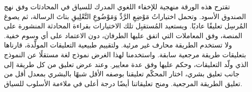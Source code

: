 %
تقترح هذه الورقة منهجية للإخفاء اللغوي المدرك للسياق في المحادثات وفق نهج الصندوق الأسود. وتحمل اختياراتُ مَوْضِعِ الرَّدِّ وَمَوْضُوعِ التَّعْلِيقِ بتاتَ الرسالة، ثم يصوغ المُرسِل تعليقًا عاديًا.
ويستعيد المُستقبِل تلك الاختيارات بقراءة المحادثة المنشورة على المنصة، وفق المعاملات التي اتفق عليها الطرفان، دون الاعتماد على أي وسوم خفية.
ولا تستخدم الطريقة محارف غير مرئية.
ولتقييم طبيعية التعليقات المولَّدة، قارناها بتعليقات طريقة مرجعية سابقة. واستخدمنا لهذا الغرض نموذج لغة مستقلًا عن النموذج الذي ولّد التعليقات، وحكم عليها وفق عدة معايير.
وعند عرض تعليق من كل طريقة إلى جانب تعليق بشري، اختار المحكّم تعليقنا بوصفه الأقل شبهًا بالبشري بمعدل أقل من تعليق الطريقة المرجعية. ومنح تعليقاتنا أيضًا درجة أعلى في ملاءمة الأسلوب للسياق.
